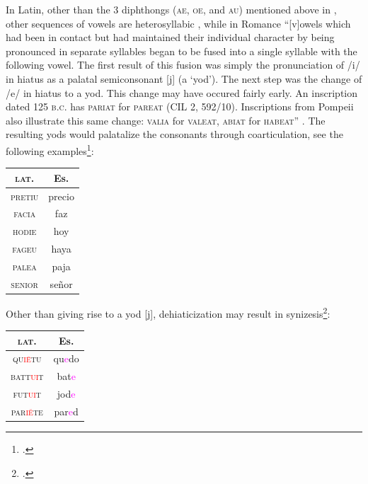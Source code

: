\documentclass{report}[12pt]
\begin{document}
In Latin, other than the 3 diphthongs (\textsc{ae}, \textsc{oe}, and \textsc{au}) mentioned above in , other sequences of vowels are heterosyllabic \parencite[p.~57]{romance_his}, while in Romance ``[v]owels which had been in contact but had maintained their individual character by being pronounced in separate syllables began to be fused into a single syllable with the following vowel. The first result of this fusion was simply the pronunciation of /i/ in hiatus as a palatal semiconsonant [j] (a `yod'). The next step was the change of /e/ in hiatus to a yod. This change may have occured fairly early. An inscription dated 125 \textsc{b.c.} has \textsc{pariat} for \textsc{pareat} (CIL 2, 592/10). Inscriptions from Pompeii also illustrate this same change: \textsc{valia} for \textsc{valeat}, \textsc{abiat} for \textsc{habeat}'' \parencite[p.~132]{lloyd_spanish}. The resulting yods would palatalize the consonants through coarticulation, see the following examples\footcite[p.~58]{romance_his}:
\begin{center}
  \begin{tabular}{c c}
    \textsc{lat.} & Es. \\
    \hline
    \textsc{pretiu} & precio \\
    \textsc{facia} & faz \\
    \textsc{hodie} & hoy \\
    \textsc{fageu} & haya \\
    \textsc{palea} & paja \\
    \textsc{senior} & se\~{n}or \\
  \end{tabular}
\end{center}
Other than giving rise to a yod [j], dehiaticization may result in synizesis\footcite[p.~57]{romance_his}: 
\begin{center}
  \begin{tabular}{c c}
    \textsc{lat.} & Es. \\
    \hline
    \textsc{qu\textcolor{red}{i\={e}}tu} & qu\textcolor{magenta}{e}do \\
    \textsc{batt\textcolor{red}{ui}t} & bat\textcolor{magenta}{e} \\
    \textsc{fut\textcolor{red}{ui}t} & jod\textcolor{magenta}{e} \\
    \textsc{par\textcolor{red}{i\u{e}}te} & par\textcolor{magenta}{e}d \\
  \end{tabular}
\end{center}
\end{document}
